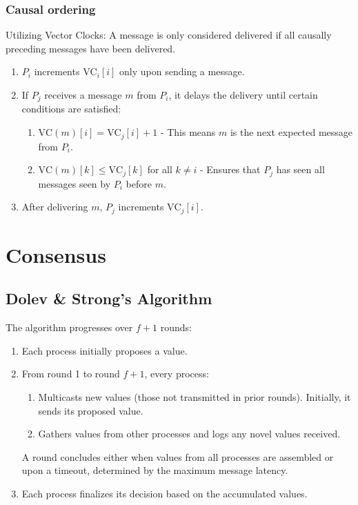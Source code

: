 \subsubsection{Causal ordering}
Utilizing Vector Clocks:
A message is only considered delivered if all causally preceding messages have been delivered.
        \begin{enumerate}
            \item \( P_i \) increments \( \text{VC}_i[i] \) only upon sending a message.
            \item If \( P_j \) receives a message \( m \) from \( P_i \), it delays the delivery until certain conditions are satisfied:
            \begin{enumerate}
                \item \( \text{VC}(m)[i] = \text{VC}_j[i] + 1 \) - This means \( m \) is the next expected message from \( P_i \).
                \item \( \text{VC}(m)[k] \leq \text{VC}_j[k] \) for all \( k \neq i \) - Ensures that \( P_j \) has seen all messages seen by \( P_i \) before \( m \).
            \end{enumerate}
            \item After delivering \( m \), \( P_j \) increments \( \text{VC}_j[i] \).
        \end{enumerate}



\section{Consensus}
\subsection{Dolev \& Strong's Algorithm}
The algorithm progresses over \( f + 1 \) rounds:
    \begin{enumerate}
        \item Each process initially proposes a value.
        \item From round 1 to round \( f + 1 \), every process:
        \begin{enumerate}
            \item Multicasts new values (those not transmitted in prior rounds). Initially, it sends its proposed value.
            \item Gathers values from other processes and logs any novel values received.
            
        \end{enumerate}
        A round concludes either when values from all processes are assembled or upon a timeout, determined by the maximum message latency.
        \item Each process finalizes its decision based on the accumulated values.
    \end{enumerate}


